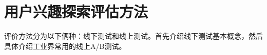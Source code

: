   \begin{figure}
  \centering
    \label{pic:hl_lineReg}
  \end{figure}

\section{用户兴趣探索评估方法}
评价方法分为以下俩种：线下测试和线上测试。首先介绍线下测试基本概念，然后具体介绍工业界常用的线上A/B测试。
